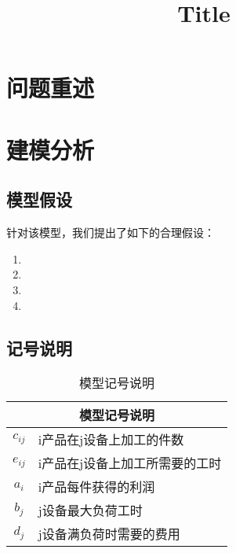 \documentclass[nocover]{cumcmart}%
\begin{document}


\title{Title}
\maketitle
\begin{cnabstract}%


\end{cnabstract}

\newpage


\section{问题重述}


\section{建模分析}

\subsection{模型假设}
针对该模型，我们提出了如下的合理假设：
\begin{enumerate}
\item 
\item 
\item 
\item 
\end{enumerate}

\subsection{记号说明}
\begin{table}[!htbp]
    \centering
    \begin{tabular}{cl}
    \toprule
    \multicolumn{2}{c}{\large 模型记号说明}\\
    \midrule
    ${c_{ij}}$ &  i产品在j设备上加工的件数 \\
    ${e_{ij}}$ &  i产品在j设备上加工所需要的工时 \\
    ${a_i}$    &  i产品每件获得的利润 \\
    ${b_j}$    &  j设备最大负荷工时 \\
    ${d_j}$    &  j设备满负荷时需要的费用 \\
    \bottomrule
    \end{tabular}
    \caption{模型记号说明}
\end{table}
\end{document}

